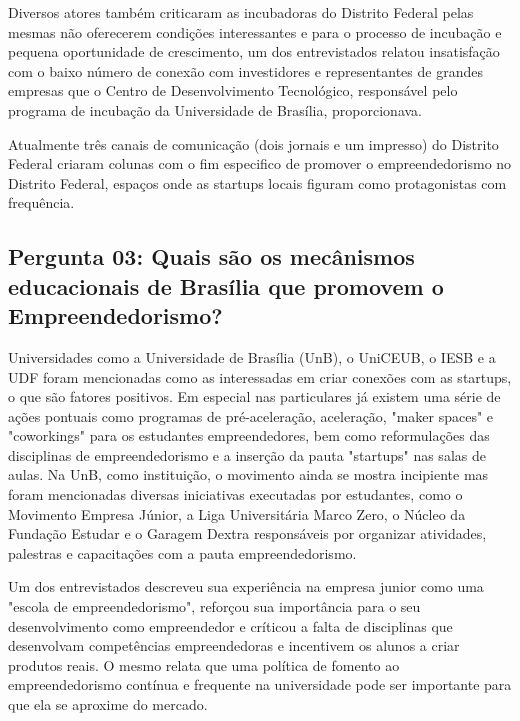 Diversos atores também criticaram as incubadoras do Distrito Federal pelas mesmas não oferecerem condições interessantes e para o processo de incubação e pequena oportunidade de crescimento, um dos entrevistados relatou insatisfação com o baixo número de conexão com investidores e representantes de grandes empresas que o Centro de Desenvolvimento Tecnológico, responsável pelo programa de incubação da Universidade de Brasília, proporcionava.

Atualmente três canais de comunicação (dois jornais e um impresso) do Distrito Federal criaram colunas com o fim especifico de promover o empreendedorismo no Distrito Federal, espaços onde as startups locais figuram como protagonistas com frequência.

\subsection*{Pergunta 03: Quais são os mecânismos educacionais de Brasília que promovem o Empreendedorismo?}
\label{subsection:pergunta_de_pesquisa_3}

Universidades como a Universidade de Brasília (UnB), o UniCEUB, o IESB e a UDF foram mencionadas como as  interessadas em criar conexões com as startups, o que são fatores positivos. Em especial nas particulares já existem uma série de ações pontuais como programas de pré-aceleração, aceleração, "maker spaces" e "coworkings" para os estudantes empreendedores, bem como reformulações das disciplinas de empreendedorismo e a inserção da pauta "startups" nas salas de aulas. Na UnB, como instituição, o movimento ainda se mostra incipiente mas foram mencionadas diversas iniciativas executadas por estudantes, como o Movimento Empresa Júnior, a Liga Universitária Marco Zero, o Núcleo da Fundação Estudar e o Garagem Dextra responsáveis por organizar atividades, palestras e capacitações com a pauta empreendedorismo. 

Um dos entrevistados descreveu sua experiência na empresa junior como uma "escola de empreendedorismo", reforçou sua importância para o seu desenvolvimento como empreendedor e críticou a falta de disciplinas que desenvolvam competências empreendedoras e incentivem os alunos a criar produtos reais. O mesmo relata que uma política de fomento ao empreendedorismo contínua e frequente na universidade pode ser importante para que ela se aproxime do mercado. 

